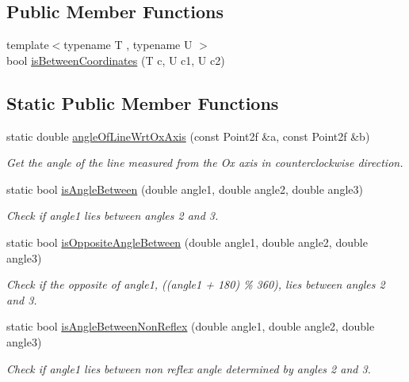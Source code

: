 \subsection*{Public Member Functions}
\begin{DoxyCompactItemize}
\item 
{\footnotesize template$<$typename T , typename U $>$ }\\bool \hyperlink{classmultiscale_1_1Geometry2D_adc334365732eb2db3419a4cc2063485c}{is\-Between\-Coordinates} (T c, U c1, U c2)
\end{DoxyCompactItemize}
\subsection*{Static Public Member Functions}
\begin{DoxyCompactItemize}
\item 
static double \hyperlink{classmultiscale_1_1Geometry2D_a5c91b7d536f0445afa9c68c73ffe4139}{angle\-Of\-Line\-Wrt\-Ox\-Axis} (const Point2f \&a, const Point2f \&b)
\begin{DoxyCompactList}\small\item\em Get the angle of the line measured from the Ox axis in counterclockwise direction. \end{DoxyCompactList}\item 
static bool \hyperlink{classmultiscale_1_1Geometry2D_a6555ae4c2762e25444bc0874e9bbc535}{is\-Angle\-Between} (double angle1, double angle2, double angle3)
\begin{DoxyCompactList}\small\item\em Check if angle1 lies between angles 2 and 3. \end{DoxyCompactList}\item 
static bool \hyperlink{classmultiscale_1_1Geometry2D_aa373f78afdba238ebe3bafaac6076aef}{is\-Opposite\-Angle\-Between} (double angle1, double angle2, double angle3)
\begin{DoxyCompactList}\small\item\em Check if the opposite of angle1, ((angle1 + 180) \% 360), lies between angles 2 and 3. \end{DoxyCompactList}\item 
static bool \hyperlink{classmultiscale_1_1Geometry2D_a907466755f2d460e95e2bace5b386768}{is\-Angle\-Between\-Non\-Reflex} (double angle1, double angle2, double angle3)
\begin{DoxyCompactList}\small\item\em Check if angle1 lies between non reflex angle determined by angles 2 and 3. \end{DoxyCompactList}\item 

\end{DoxyCompactItemize}
